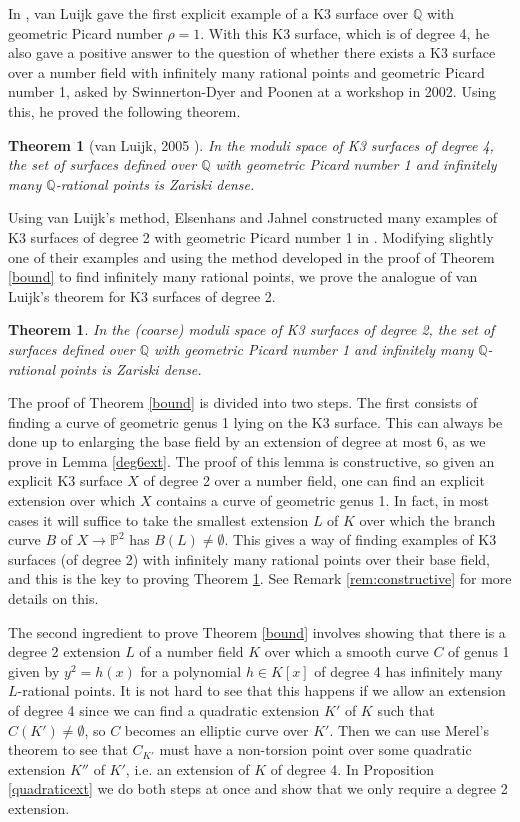 \documentclass[11pt]{amsart}
\newcommand{\QQ}{\mathbb{Q}}
\newcommand{\PP}{\mathbb{P}}
\newcommand{\map}{\rightarrow}
\theoremstyle{plain}
\newtheorem{theorem}[lemma]{Theorem}
\theoremstyle{remark}
\begin{document}
In \cite{vluijk}, van Luijk gave the first explicit example of a K3 surface over $\QQ$ with geometric Picard number $\rho=1$. With this K3 surface, which is of degree 4, he also gave a positive answer to the question of whether there exists a K3 surface over a number field with infinitely many rational points and geometric Picard number 1, asked by Swinnerton-Dyer and Poonen at a workshop in 2002. Using this, he proved the following theorem. 
\begin{theorem}[van Luijk, 2005 \cite{vluijk}]
In the moduli space of K3 surfaces of degree 4, the set of surfaces defined over $\QQ$ with geometric Picard number 1 and infinitely many $\QQ$-rational points is Zariski dense.     
\end{theorem}

Using van Luijk's method, Elsenhans and Jahnel constructed many examples of K3 surfaces of degree 2 with geometric Picard number 1 in \cite{eljah}. Modifying slightly one of their examples and using the method developed in the proof of Theorem \ref{bound} to find infinitely many rational points, we prove the analogue of van Luijk's theorem for K3 surfaces of degree 2.


\begin{theorem}\label{moduli}
In the (coarse) moduli space of K3 surfaces of degree 2, the set of surfaces defined over $\QQ$ with geometric Picard number 1 and infinitely many $\QQ$-rational points is Zariski dense. 
\end{theorem}



The proof of Theorem \ref{bound} is divided into two steps. The first consists of finding a curve of geometric genus 1 lying on the K3 surface. This can always be done up to enlarging the base field by an extension of degree at most 6, as we prove in Lemma \ref{deg6ext}. The proof of this lemma is constructive, so given an explicit K3 surface $X$ of degree 2 over a number field, one can find an explicit extension over which $X$ contains a curve of geometric genus 1. In fact, in most cases it will suffice to take the smallest extension $L$ of $K$ over which the branch curve $B$ of $X\map \PP^2$ has $B(L)\neq \emptyset$. This gives a way of finding examples of K3 surfaces (of degree 2) with infinitely many rational points over their base field, and this is the key to proving Theorem \ref{moduli}. See Remark \ref{rem:constructive} for more details on this. 

The second ingredient to prove Theorem \ref{bound} involves showing that there is a degree 2 extension $L$ of a number field $K$ over which a smooth curve $C$ of genus 1 given by $y^2=h(x)$ for a polynomial $h\in K[x]$ of degree 4 has infinitely many $L$-rational points. It is not hard to see that this happens if we allow an extension of degree 4 since we can find a quadratic extension $K'$ of $K$ such that $C(K')\neq \emptyset$, so $C$ becomes an elliptic curve over $K'$. Then we can use Merel's theorem \cite[p.~242]{AEC} to see that $C_{K'}$ must have a non-torsion point over some quadratic extension $K''$ of $K'$, i.e. an extension of $K$ of degree 4. In Proposition \ref{quadraticext} we do both steps at once and show that we only require a degree 2 extension.
\end{document}
